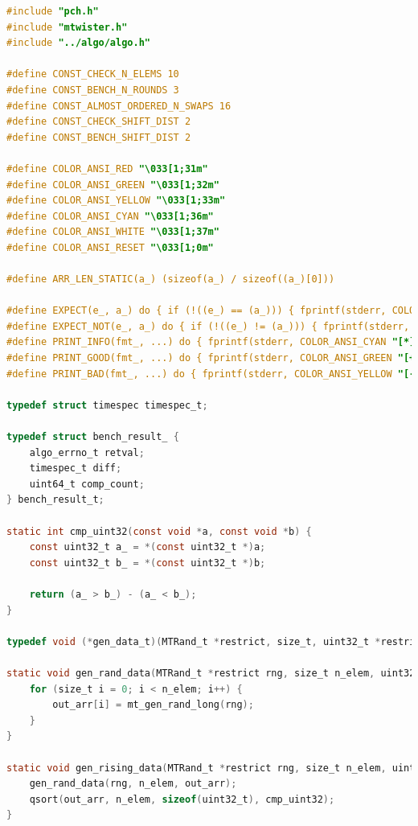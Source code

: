 \documentclass[12pt]{article}
\begin{document}
\begin{lstlisting}[language=C]
#include "pch.h"
#include "mtwister.h"
#include "../algo/algo.h"

#define CONST_CHECK_N_ELEMS 10
#define CONST_BENCH_N_ROUNDS 3
#define CONST_ALMOST_ORDERED_N_SWAPS 16
#define CONST_CHECK_SHIFT_DIST 2
#define CONST_BENCH_SHIFT_DIST 2

#define COLOR_ANSI_RED "\033[1;31m"
#define COLOR_ANSI_GREEN "\033[1;32m"
#define COLOR_ANSI_YELLOW "\033[1;33m"
#define COLOR_ANSI_CYAN "\033[1;36m"
#define COLOR_ANSI_WHITE "\033[1;37m"
#define COLOR_ANSI_RESET "\033[1;0m"

#define ARR_LEN_STATIC(a_) (sizeof(a_) / sizeof((a_)[0]))

#define EXPECT(e_, a_) do { if (!((e_) == (a_))) { fprintf(stderr, COLOR_ANSI_RED "[!]" COLOR_ANSI_RESET " " __FUNCTION__ "():%d: Assertion (" #a_ " == " #e_ ") failed", __LINE__); abort(); } } while (0)
#define EXPECT_NOT(e_, a_) do { if (!((e_) != (a_))) { fprintf(stderr, COLOR_ANSI_RED "[!]" COLOR_ANSI_RESET " " __FUNCTION__ "():%d: Assertion (" #a_ " != " #e_ ") failed", __LINE__); abort(); } } while (0)
#define PRINT_INFO(fmt_, ...) do { fprintf(stderr, COLOR_ANSI_CYAN "[*]" COLOR_ANSI_RESET " " __FUNCTION__ "():%d: " fmt_, __LINE__, ##__VA_ARGS__); } while (0)
#define PRINT_GOOD(fmt_, ...) do { fprintf(stderr, COLOR_ANSI_GREEN "[+]" COLOR_ANSI_RESET " " __FUNCTION__ "():%d: " fmt_, __LINE__, ##__VA_ARGS__); } while (0)
#define PRINT_BAD(fmt_, ...) do { fprintf(stderr, COLOR_ANSI_YELLOW "[-]" COLOR_ANSI_RESET " " __FUNCTION__ "():%d: " fmt_, __LINE__, ##__VA_ARGS__); } while (0)

typedef struct timespec timespec_t;

typedef struct bench_result_ {
    algo_errno_t retval;
    timespec_t diff;
    uint64_t comp_count;
} bench_result_t;

static int cmp_uint32(const void *a, const void *b) {
    const uint32_t a_ = *(const uint32_t *)a;
    const uint32_t b_ = *(const uint32_t *)b;

    return (a_ > b_) - (a_ < b_);
}

typedef void (*gen_data_t)(MTRand_t *restrict, size_t, uint32_t *restrict);

static void gen_rand_data(MTRand_t *restrict rng, size_t n_elem, uint32_t *restrict out_arr) {
    for (size_t i = 0; i < n_elem; i++) {
        out_arr[i] = mt_gen_rand_long(rng);
    }
}

static void gen_rising_data(MTRand_t *restrict rng, size_t n_elem, uint32_t *restrict out_arr) {
    gen_rand_data(rng, n_elem, out_arr);
    qsort(out_arr, n_elem, sizeof(uint32_t), cmp_uint32);
}


\end{lstlisting}
\end{document}
